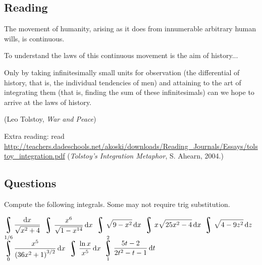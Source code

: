 


\subsection*{Reading}
The movement of humanity, arising as it does from innumerable
arbitrary human wills, is continuous.

To understand the laws of this continuous movement is the aim
of history...

Only by taking infinitesimally small units for observation (the
differential of history, that is, the individual tendencies of men) and
attaining to the art of integrating them (that is, finding the sum of
these infinitesimals) can we hope to arrive at the laws of history.

(Leo Tolstoy, \textit{War and Peace})

Extra reading: read \small{\url{http://teachers.dadeschools.net/akoski/downloads/Reading_Journals/Essays/tolstoy_integration.pdf}}
(\textit{Tolstoy's Integration Metaphor}, S. Ahearn, 2004.)

\subsection*{Questions}
Compute the following integrals. Some may not require trig substitution.
\begin{questions}
  \question $ \displaystyle\rint \frac{\dif{x}}{\sqrt{x^2 + 4}} $
  \question $ \displaystyle\rint \frac{x^6}{\sqrt{1 - x^{14}}} \dif{x} $
  \question $ \displaystyle\rint \sqrt{9 - x^2} \dif{x} $
  \question $ \displaystyle\rint x \sqrt{25x^2 - 4} \dif{x} $
  \question $ \displaystyle\rint \sqrt{4-9z^2} \dif{z} $
  \question $ \displaystyle\rint^{1/6}_0 \frac{x^5}{\left( 36x^2 + 1 \right)^{3/2}} \dif{x} $
  \question $ \displaystyle\rint \frac{\ln x}{x^5} \dif{x} $
  \question $ \displaystyle\rint^2_1 \frac{5t - 2}{2t^2 - t - 1} \dif{t} $
\end{questions}



